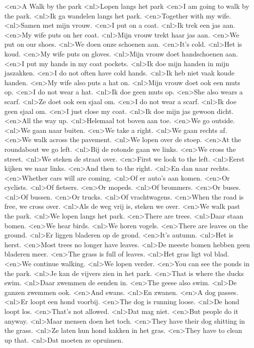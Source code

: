 <en>A Walk by the park
<nl>Lopen langs het park
<en>I am going to walk by  the park.
<nl>Ik ga wandelen langs het park.
<en>Together with my wife.
<nl>Samen met mijn vrouw.
<en>I put on a coat.
<nl>Ik trek een jas aan.
<en>My wife puts on her coat.
<nl>Mijn vrouw trekt haar jas aan.
<en>We put on our shoes.
<nl>We doen onze schoenen aan.
<en>It's cold.
<nl>Het is koud.
<en>My wife puts on gloves.
<nl>Mijn vrouw doet handschoenen aan.
<en>I put my hands in my coat pockets.
<nl>Ik doe mijn handen in mijn jaszakken.
<en>I do not often have cold hands.
<nl>Ik heb niet vaak koude handen.
<en>My wife also puts a hat on.
<nl>Mijn vrouw doet ook een muts op.
<en>I do not wear a hat.
<nl>Ik doe geen muts op.
<en>She also wears a scarf.
<nl>Ze doet ook een sjaal om.
<en>I do not wear a scarf.
<nl>Ik doe geen sjaal om.
<en>I just close my coat.
<nl>Ik doe mijn jas gewoon dicht.
<en>All the way up.
<nl>Helemaal tot boven aan toe.
<en>We go outside.
<nl>We gaan naar buiten.
<en>We take a right.
<nl>We gaan rechts af.
<en>We walk across the pavement.
<nl>We lopen over de stoep.
<en>At the roundabout we go left.
<nl>Bij de rotonde gaan we links.
<en>We cross the street.
<nl>We steken de straat over.
<en>First we look to the left.
<nl>Eerst kijken we naar links.
<en>And then to the right.
<nl>En dan naar rechts.
<en>Whether cars will are coming.
<nl>Of er auto's aan komen.
<en>Or cyclists.
<nl>Of fietsers.
<en>Or mopeds.
<nl>Of brommers.
<en>Or buses.
<nl>Of bussen.
<en>Or trucks.
<nl>Of vrachtwagens.
<en>When the road is free, we cross over.
<nl>Als de weg vrij is, steken we over.
<en>We walk past the park.
<nl>We lopen langs het park.
<en>There are trees.
<nl>Daar staan bomen.
<en>We hear birds.
<nl>We horen vogels.
<en>There are leaves on the ground.
<nl>Er liggen bladeren op de grond.
<en>It's autumn.
<nl>Het is herst.
<en>Most trees no longer have leaves.
<nl>De meeste bomen hebben geen bladeren meer.
<en>The grass is full of leaves.
<nl>Het gras ligt vol blad.
<en>We continue walking.
<nl>We lopen verder.
<en>You can see the ponds in the park.
<nl>Je kan de vijvers zien in het park.
<en>That is where the ducks swim.
<nl>Daar zwemmen de eenden in.
<en>The geese also swim.
<nl>De ganzen zwemmen ook.
<en>And swans.
<nl>En zwanen.
<en>A dog passes.
<nl>Er loopt een hond voorbij.
<en>The dog is running loose.
<nl>De hond loopt los.
<en>That's not allowed.
<nl>Dat mag niet.
<en>But people do it anyway.
<nl>Maar mensen doen het toch.
<en>They have their dog shitting in the grass.
<nl>Ze laten hun hond kakken in het gras.
<en>They have to clean up that.
<nl>Dat moeten ze opruimen.
